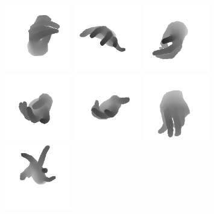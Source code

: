 \begin{figure}
    \includegraphics[width=110px]{figs/mano/0.png}
    \includegraphics[width=110px]{figs/mano/1.png}
    \includegraphics[width=110px]{figs/mano/2.png}
    \includegraphics[width=110px]{figs/mano/3.png}
    \includegraphics[width=110px]{figs/mano/4.png}
    \includegraphics[width=110px]{figs/mano/5.png}
    \includegraphics[width=110px]{figs/mano/6.png}

\end{figure}
